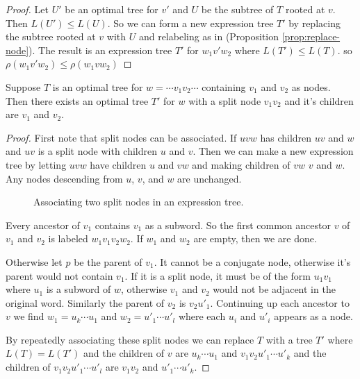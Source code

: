 \documentclass[12pt]{thesis}
\begin{document}
\begin{proof}
    Let $U'$ be an optimal tree for $v'$
    and $U$ be the subtree of $T$ rooted at $v$.
    Then $L(U') \leq L(U)$.
    So we can form a new expression
    tree $T'$ by replacing 
    the subtree rooted at $v$
    with $U$ and relabeling as in (Proposition \ref{prop:replace-node}).
    The result is an expression tree $T'$ for $w_{1}v'w_{2}$
    where $L(T') \leq L(T)$.
    so $\rho(w_{1}v'w_{2}) \leq \rho(w_{1}vw_{2})$
\end{proof}

\begin{proposition}
    \label{prop:reorder-tree}
    Suppose $T$ is an optimal tree for
    $w = \cdots v_{1}v_{2} \cdots$
    containing $v_{1}$ and $v_{2}$ as nodes.
    Then there exists an optimal tree $T'$
    for $w$ with a split node $v_{1}v_{2}$
    and it's children are $v_{1}$ and $v_{2}$.
\end{proposition}

\begin{proof}
    First note that split nodes can be associated.
    If $uvw$ has children $uv$ and $w$
    and $uv$ is a split node with children $u$ and $v$.
    Then we can make a new expression
    tree by letting $uvw$ have children $u$ and $vw$
    and making children of $vw$ $v$ and $w$.
    Any nodes descending from $u$, $v$, and $w$ are unchanged.

    \begin{figure}[h]
        \centering
        \def\svgwidth{6cm}
        
        \caption{Associating two split nodes in an expression tree.}
        \label{fig:expression-tree}
    \end{figure}

    Every ancestor of $v_{1}$ contains $v_{1}$ as a subword.
    So the first common ancestor $v$ of $v_{1}$ and $v_{2}$
    is labeled  $w_{1}v_{1}v_{2}w_{2}$.
    If $w_{1}$ and $w_{2}$ are empty, then we are done.

    Otherwise let $p$ be the parent of $v_{1}$.
    It cannot be a conjugate node,
    otherwise it's parent would not contain $v_{1}$.
    If it is a split node, it must be of the form
    $u_{1} v_{1}$ where $u_{1}$ is a subword of $w$,
    otherwise $v_{1}$ and $v_{2}$
    would not be adjacent in the original word.
    Similarly the parent of $v_{2}$ is $v_{2} u'_{1}$.
    Continuing up each ancestor to $v$
    we find $w_{1} = u_{k} \cdots u_{1}$ and
    $w_{2} = u'_{1} \cdots u'_{l}$
    where each $u_{i}$ and $u'_{i}$
    appears as a node.

    By repeatedly associating these split nodes we can replace $T$
    with a tree $T'$
    where $L(T) = L(T')$
    and the children of $v$
    are $u_{k} \cdots u_{1}$ and
    $v_{1}v_{2} u'_{1} \cdots u'_{k}$
    and the children of $v_{1}v_{2} u'_{1} \cdots u'_{l}$
    are $v_{1}v_{2}$ and $u'_{1} \cdots u'_{k}$.
\end{proof}
\end{document}
